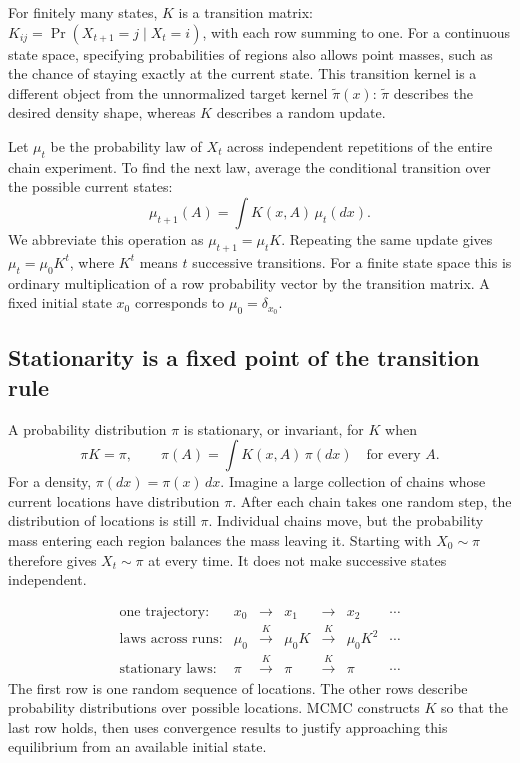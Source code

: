 \documentclass[11pt,a4paper]{article}
\begin{document}
For finitely many states, $K$ is a transition matrix:
$K_{ij}=\Pr(X_{t+1}=j\mid X_t=i)$, with each row summing to one.
For a continuous state space, specifying probabilities of regions also allows
point masses, such as the chance of staying exactly at the current state.
This transition kernel is a different object from the unnormalized target
kernel $\widetilde\pi(x)$: $\widetilde\pi$ describes the desired density shape,
whereas $K$ describes a random update.

Let $\mu_t$ be the probability law of $X_t$ across independent repetitions of
the entire chain experiment. To find the next law, average the conditional
transition over the possible current states:
\[
 \mu_{t+1}(A)=\int K(x,A)\,\mu_t(dx).
\]
We abbreviate this operation as $\mu_{t+1}=\mu_tK$. Repeating the same update
gives $\mu_t=\mu_0K^t$, where $K^t$ means $t$ successive transitions.
For a finite state space this is ordinary multiplication of a row probability
vector by the transition matrix. A fixed initial state $x_0$ corresponds to
$\mu_0=\delta_{x_0}$.

\subsection{Stationarity is a fixed point of the transition rule}
A probability distribution $\pi$ is stationary, or invariant, for $K$ when
\[
 \pi K=\pi,\qquad
 \pi(A)=\int K(x,A)\,\pi(dx)\quad\text{for every }A.
\]
For a density, $\pi(dx)=\pi(x)\,dx$. Imagine a large collection of chains
whose current locations have distribution $\pi$. After each chain takes one
random step, the distribution of locations is still $\pi$. Individual chains
move, but the probability mass entering each region balances the mass leaving
it. Starting with $X_0\sim\pi$ therefore gives $X_t\sim\pi$ at every time.
It does not make successive states independent.

\[
 \begin{array}{rcccccc}
 \text{one trajectory:}
   &x_0&\longrightarrow&x_1&\longrightarrow&x_2&\cdots\\[3pt]
 \text{laws across runs:}
   &\mu_0&\xrightarrow{\ K\ }&\mu_0K&\xrightarrow{\ K\ }&\mu_0K^2&\cdots\\[3pt]
 \text{stationary laws:}
   &\pi&\xrightarrow{\ K\ }&\pi&\xrightarrow{\ K\ }&\pi&\cdots
 \end{array}
\]
The first row is one random sequence of locations. The other rows describe
probability distributions over possible locations. MCMC constructs $K$ so
that the last row holds, then uses convergence results to justify approaching
this equilibrium from an available initial state.
\end{document}
